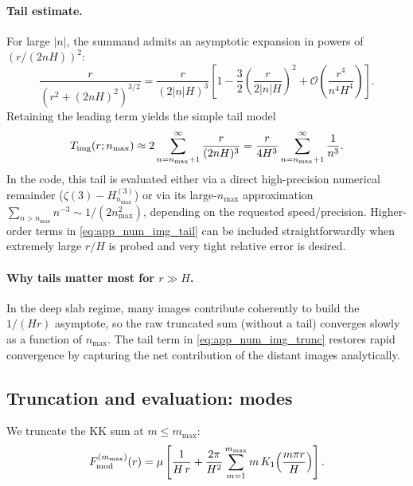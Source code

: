 \documentclass[11pt]{article}
\begin{document}
\paragraph{Tail estimate.}
For large $|n|$, the summand admits an asymptotic expansion in powers of $(r/(2nH))^2$:
\begin{equation}
  \frac{r}{\left(r^2+(2nH)^2\right)^{3/2}}
  =
  \frac{r}{(2|n|H)^3}
  \left[
    1-\frac{3}{2}\left(\frac{r}{2|n|H}\right)^2
    +\mathcal{O}\!\left(\frac{r^4}{n^4H^4}\right)
  \right].
\end{equation}
Retaining the leading term yields the simple tail model
\begin{equation}
  T_{\rm img}(r;n_{\max})
  \approx 2\sum_{n=n_{\max}+1}^{\infty}\frac{r}{(2nH)^3}
  = \frac{r}{4H^3}\sum_{n=n_{\max}+1}^{\infty}\frac{1}{n^3}.
  \label{eq:app_num_img_tail}
\end{equation}
In the code, this tail is evaluated either via a direct high-precision numerical remainder
($\zeta(3)-H_{n_{\max}}^{(3)}$) or via its large-$n_{\max}$ approximation
$\sum_{n>n_{\max}}n^{-3}\sim 1/(2n_{\max}^2)$, depending on the requested speed/precision.
Higher-order terms in \eqref{eq:app_num_img_tail} can be included straightforwardly when extremely
large $r/H$ is probed and very tight relative error is desired.

\paragraph{Why tails matter most for $r\gg H$.}
In the deep slab regime, many images contribute coherently to build the $1/(Hr)$ asymptote, so the
raw truncated sum (without a tail) converges slowly as a function of $n_{\max}$.
The tail term in \eqref{eq:app_num_img_trunc} restores rapid convergence by capturing the net
contribution of the distant images analytically.

\subsection{Truncation and evaluation: modes}

We truncate the KK sum at $m\le m_{\max}$:
\begin{equation}
  F_{\rm mod}^{(m_{\max})}(r)
  = \mu\left[
    \frac{1}{H\,r}
    +\frac{2\pi}{H^2}\sum_{m=1}^{m_{\max}}
    m\,K_1\!\left(\frac{m\pi r}{H}\right)
  \right].
  \label{eq:app_num_mod_trunc}
\end{equation}
\end{document}
